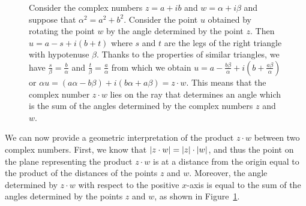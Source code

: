 \begin{figure}
  \begin{center}
  \end{center}
  \caption{Consider the complex numbers $z=a+ib$ and $w=\alpha+i\beta$
  and suppose that $\alpha^2 = a^2+b^2$.
  Consider the point $u$ obtained by rotating the point $w$ by the angle
  determined by the point $z$. Then $u=a-s + i(b+t)$ where $s$ and $t$
  are the legs of the right triangle with hypotenuse $\beta$.
  Thanks to the properties of similar triangles, we have
  $\frac{s}{\beta} = \frac{b}{\alpha}$ and $\frac{t}{\beta} = \frac{a}{\alpha}$
  from which we obtain $u = a-\frac{b\beta}{\alpha}+i(b+\frac{a\beta}{\alpha})$
  or $\alpha u = (a\alpha - b \beta) + i (b\alpha + a \beta) = z\cdot w$.
  This means that the complex number $z\cdot w$ lies on the ray
  that determines an angle which is the sum of the angles determined
  by the complex numbers $z$ and $w$.
  }
  \label{fig:prodotto_complesso}
\end{figure}

We can now provide a geometric interpretation of the product $z\cdot w$
between two complex numbers. First, we know that ${\left|z\cdot w\right|} = {\left|z\right|} \cdot
{\left|w\right|}$, and thus the point on the plane representing the product $z\cdot w$ is
at a distance from the origin equal to the product of the distances of the
points $z$ and $w$. Moreover, the angle determined by $z\cdot w$ with respect to
the positive $x$-axis is equal to the sum of the angles determined by the points
$z$ and $w$, as shown in Figure~\ref{fig:prodotto_complesso}.

